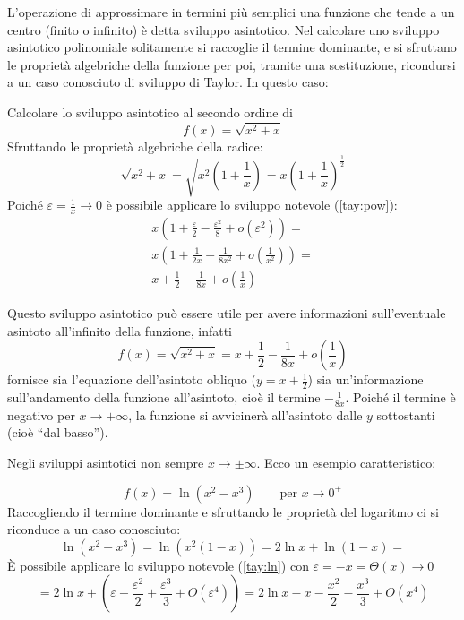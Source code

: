 L'operazione di approssimare in termini più semplici una funzione che tende a un centro (finito o infinito) è detta sviluppo asintotico. Nel calcolare uno sviluppo asintotico polinomiale solitamente si raccoglie il termine dominante, e si sfruttano le proprietà algebriche della funzione per poi, tramite una sostituzione, ricondursi a un caso conosciuto di sviluppo di Taylor. In questo caso:
\begin{examp}
	Calcolare lo sviluppo asintotico al secondo ordine di
	\[
		f(x)=\sqrt{x^2+x}
	\]
	Sfruttando le proprietà algebriche della radice:
	\[
		\sqrt{x^2+x}=\sqrt{x^2\left(1+\frac{1}{x}\right)}=x\left(1+\frac{1}{x}\right)^{\frac{1}{2}}
	\]
	Poiché $\varepsilon=\frac{1}{x}\to0$ è possibile applicare lo sviluppo notevole (\ref{tay:pow}):
	\begin{gather*}
		x\left(1+\frac{\varepsilon}{2}-\frac{\varepsilon^2}{8}+o(\varepsilon^2)\right)=\\
		x\left(1+\frac{1}{2x}-\frac{1}{8x^2}+o\left(\frac{1}{x^2}\right)\right)=\\
		x+\frac{1}{2}-\frac{1}{8x}+o\left(\frac{1}{x}\right)
	\end{gather*}

	Questo sviluppo asintotico può essere utile per avere informazioni sull'eventuale asintoto all'infinito della funzione, infatti
	\[
		f(x)=\sqrt{x^2+x}=x+\frac{1}{2}-\frac{1}{8x}+o\left(\frac{1}{x}\right)
	\]
	fornisce sia l'equazione dell'asintoto obliquo ($y=x+\frac{1}{2}$) sia un'informazione sull'andamento della funzione all'asintoto, cioè il termine $-\frac{1}{8x}$. Poiché il termine è negativo per $x\to+\infty$, la funzione si avvicinerà all'asintoto dalle $y$ sottostanti (cioè ``dal basso'').
\end{examp}

Negli sviluppi asintotici non sempre $x\to\pm\infty$. Ecco un esempio caratteristico:
\begin{examp}
	\[
		f(x)=\ln(x^2-x^3)\qquad\text{per $x\to0^+$}
	\]
	Raccogliendo il termine dominante e sfruttando le proprietà del logaritmo ci si riconduce a un caso conosciuto:
	\[
		\ln(x^2-x^3)=\ln(x^2(1-x))=2\ln x+\ln(1-x)=
	\]
	È possibile applicare lo sviluppo notevole (\ref{tay:ln}) con $\varepsilon=-x=\Theta(x)\to0$
	\[
		=2\ln x+\left(\varepsilon-\frac{\varepsilon^2}{2}+\frac{\varepsilon^3}{3}+O(\varepsilon^4)\right)=2\ln x-x-\frac{x^2}{2}-\frac{x^3}{3}+O(x^4)
	\]
\end{examp}

